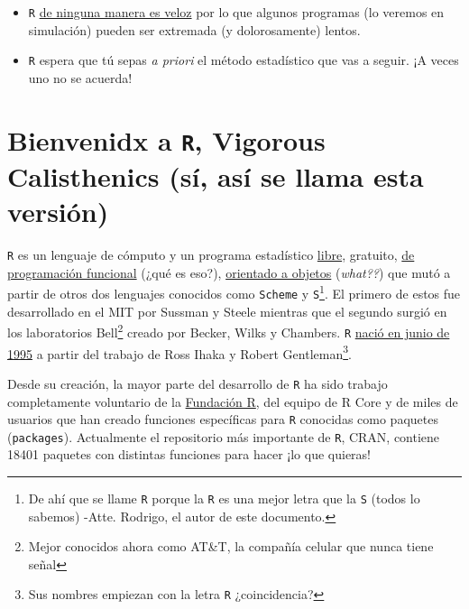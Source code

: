 \documentclass[]{tufte-book}
\begin{document}
\begin{itemize}
\item
  \texttt{R}
  \href{https://github.com/matthieugomez/benchmark-stata-r}{de ninguna
  manera es veloz} por lo que algunos programas (lo veremos en
  simulación) pueden ser extremada (y dolorosamente) lentos.
\item
  \texttt{R} espera que tú sepas \emph{a priori} el método estadístico
  que vas a seguir. ¡A veces uno no se acuerda!
\end{itemize}

\hypertarget{bienvenidx-a-r-vigorous-calisthenics-suxed-asuxed-se-llama-esta-versiuxf3n}{%
\chapter{\texorpdfstring{Bienvenidx a \texttt{R}, Vigorous Calisthenics
(sí, así se llama esta
versión)}{Bienvenidx a R, Vigorous Calisthenics (sí, así se llama esta versión)}}\label{bienvenidx-a-r-vigorous-calisthenics-suxed-asuxed-se-llama-esta-versiuxf3n}}

\texttt{R} es un lenguaje de cómputo y un programa estadístico
\href{https://www.gnu.org/philosophy/free-sw.html}{libre}, gratuito,
\href{http://adv-r.had.co.nz/Functional-programming.html}{de
programación funcional} (¿qué es eso?),
\href{https://en.wikipedia.org/wiki/Object-oriented_programming}{orientado
a objetos} (\emph{what??}) que mutó a partir de otros dos lenguajes
conocidos como \texttt{Scheme} y \texttt{S}\footnote{De ahí que se llame
  \texttt{R} porque la \texttt{R} es una mejor letra que la \texttt{S}
  (todos lo sabemos) -Atte. Rodrigo, el autor de este documento.}. El
primero de estos fue desarrollado en el MIT por Sussman y Steele
mientras que el segundo surgió en los laboratorios Bell\footnote{Mejor
  conocidos ahora como AT\&T, la compañía celular que nunca tiene señal}
creado por Becker, Wilks y Chambers. \texttt{R}
\href{https://cran.r-project.org/doc/html/interface98-paper/paper_2.html}{nació
en junio de 1995} a partir del trabajo de Ross Ihaka y Robert
Gentleman\footnote{Sus nombres empiezan con la letra \texttt{R}
  ¿coincidencia?}.

Desde su creación, la mayor parte del desarrollo de \texttt{R} ha sido
trabajo completamente voluntario de la
\href{https://www.r-project.org/foundation/}{Fundación R}, del equipo de
R Core y de miles de usuarios que han creado funciones específicas para
\texttt{R} conocidas como paquetes (\texttt{packages}). Actualmente el
repositorio más importante de \texttt{R}, CRAN, contiene 18401 paquetes
con distintas funciones para hacer ¡lo que quieras!
\end{document}
